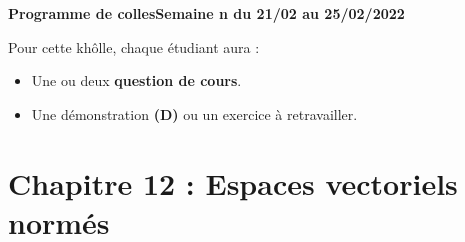 \documentclass[twoside,a4paper,french,10pt]{VcCours}
\begin{document}

\begin{center}
\large\bf
Programme de collesSemaine n du 21/02 au 25/02/2022
\end{center}
\separationTitre


Pour cette khôlle, chaque étudiant aura :
\begin{itemize}
\item Une ou deux \textbf{question de cours}.
\item Une démonstration \textbf{(D)} ou un exercice à retravailler.
\end{itemize} 
  

\section*{Chapitre 12 : Espaces vectoriels normés}
\end{document}
